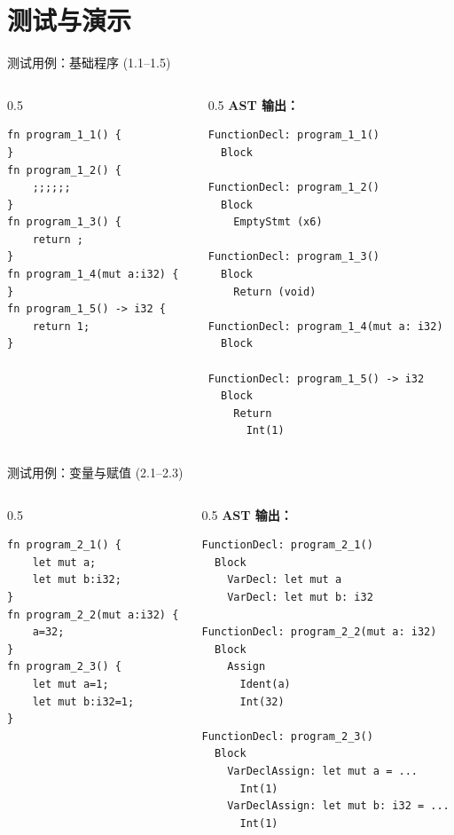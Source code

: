 \documentclass[aspectratio=169]{ctexbeamer}
\begin{document}
\section{测试与演示}

\begin{frame}{测试用例：基础程序 (1.1--1.5)}
\begin{columns}[T]
\begin{column}{0.5\textwidth}
\begin{lstlisting}[language=RustLike, basicstyle=\tiny\ttfamily]
fn program_1_1() {
}
fn program_1_2() {
    ;;;;;;
}
fn program_1_3() {
    return ;
}
fn program_1_4(mut a:i32) {
}
fn program_1_5() -> i32 {
    return 1;
}
\end{lstlisting}
\end{column}
\begin{column}{0.5\textwidth}
\textbf{AST 输出：}
\begin{lstlisting}[basicstyle=\tiny\ttfamily,numbers=none]
FunctionDecl: program_1_1()
  Block

FunctionDecl: program_1_2()
  Block
    EmptyStmt (x6)

FunctionDecl: program_1_3()
  Block
    Return (void)

FunctionDecl: program_1_4(mut a: i32)
  Block

FunctionDecl: program_1_5() -> i32
  Block
    Return
      Int(1)
\end{lstlisting}
\end{column}
\end{columns}
\end{frame}

\begin{frame}[fragile]{测试用例：变量与赋值 (2.1--2.3)}
\begin{columns}[T]
\begin{column}{0.5\textwidth}
\begin{lstlisting}[language=RustLike, basicstyle=\tiny\ttfamily]
fn program_2_1() {
    let mut a;
    let mut b:i32;
}
fn program_2_2(mut a:i32) {
    a=32;
}
fn program_2_3() {
    let mut a=1;
    let mut b:i32=1;
}
\end{lstlisting}
\end{column}
\begin{column}{0.5\textwidth}
\textbf{AST 输出：}
\begin{lstlisting}[basicstyle=\tiny\ttfamily,numbers=none]
FunctionDecl: program_2_1()
  Block
    VarDecl: let mut a
    VarDecl: let mut b: i32

FunctionDecl: program_2_2(mut a: i32)
  Block
    Assign
      Ident(a)
      Int(32)

FunctionDecl: program_2_3()
  Block
    VarDeclAssign: let mut a = ...
      Int(1)
    VarDeclAssign: let mut b: i32 = ...
      Int(1)
\end{lstlisting}
\end{column}
\end{columns}
\end{frame}
\end{document}
